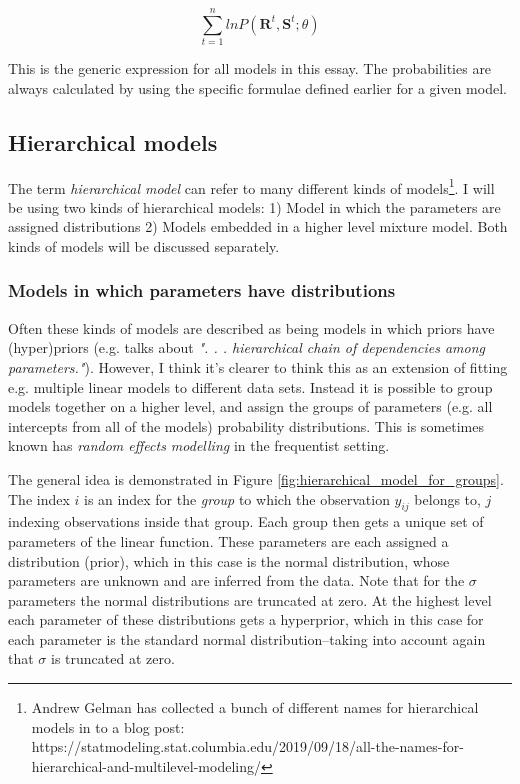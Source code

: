 \documentclass{article}\usepackage{knitr}
\begin{document}
\begin{equation}
\sum_{t=1}^n ln P(\bm{R}^t, \bm{S}^t; \theta)
\end{equation}

This is the generic expression for  all models in this essay. The probabilities are always calculated by using the specific formulae defined earlier for a given model. 

\subsection{Hierarchical models}
\label{sec:hierarchical_models}

The term \textit{hierarchical model} can refer to many different kinds of models\footnote{Andrew Gelman has collected a bunch of different names for hierarchical models in to a blog post: https://statmodeling.stat.columbia.edu/2019/09/18/all-the-names-for-hierarchical-and-multilevel-modeling/}. I will be using two kinds of hierarchical models: 1) Model in which the parameters are assigned distributions 2) Models embedded in a higher level mixture model. Both kinds of models will be discussed separately.

\subsubsection*{Models in which parameters have distributions}

Often these kinds of models are described as being models in which priors have (hyper)priors (e.g. \citet[p. 225]{kruschke2015} talks about \textit{". . . hierarchical chain of dependencies among parameters."}). However, I think it's clearer to think this as an extension of fitting e.g. multiple linear models to different data sets. Instead it is possible to group models together on a higher level, and assign the groups of parameters (e.g. all intercepts from all of the models) probability distributions. This is sometimes known has \textit{random effects modelling} in the frequentist setting.

The general idea is demonstrated in Figure \ref{fig:hierarchical_model_for_groups}. The index $i$ is an index for the \textit{group} to which the observation $y_{ij}$ belongs to, $j$ indexing observations inside that group. Each group then gets a unique set of parameters of the linear function. These parameters are each assigned a distribution (prior), which in this case is the normal distribution, whose parameters are unknown and are inferred from the data. Note that for the $\sigma$ parameters the normal distributions are truncated at zero. At the highest level each parameter of these distributions gets a hyperprior, which in this case for each parameter is the standard normal distribution--taking into account again that $\sigma$ is truncated at zero.
\end{document}
